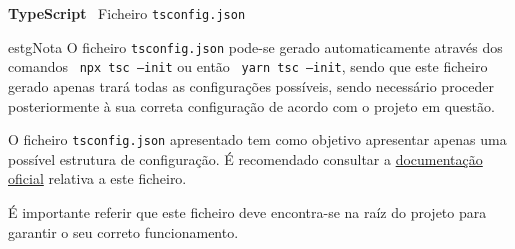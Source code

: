\label{tsconfigExample}

\begin{longlisting}
	\inputminted{json}{code/typescript/tsconfig.json}
	\caption{\textbf{TypeScript} \textemdash~Ficheiro \texttt{tsconfig.json}}
\end{longlisting}

\begin{mybox}{estg}{Nota}
	O ficheiro \texttt{tsconfig.json} pode-se gerado automaticamente através dos comandos ~\texttt{npx tsc --init} ou então ~\texttt{yarn tsc --init}, sendo que este ficheiro gerado apenas trará todas as configurações possíveis, sendo necessário proceder posteriormente à sua correta configuração de acordo com o projeto em questão.

	\vspace{0.35cm}

	O ficheiro \texttt{tsconfig.json} apresentado tem como objetivo apresentar apenas uma possível estrutura de configuração. É recomendado consultar a \href{https://www.typescriptlang.org/tsconfig}{documentação oficial} relativa a este ficheiro.

	\vspace{0.15cm}

	É importante referir que este ficheiro deve encontra-se na raíz do projeto para garantir o seu correto funcionamento.
\end{mybox}